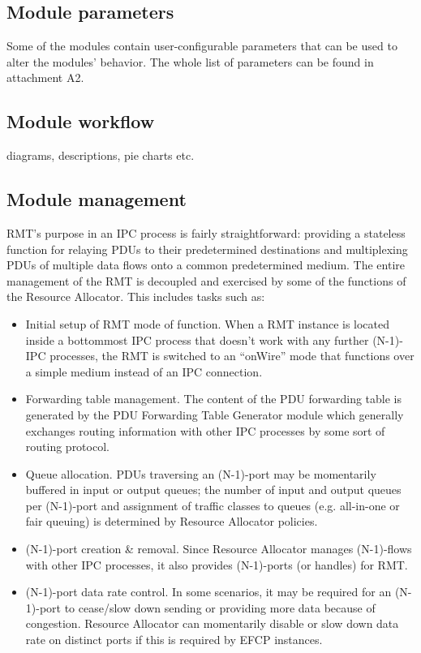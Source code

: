         \subsection{Module parameters}
            Some of the modules contain user-configurable parameters that can be used to alter the modules' behavior. The whole list of parameters can be found in attachment A2.

        \subsection{Module workflow}
            diagrams, descriptions, pie charts etc.

        \subsection{Module management}
            RMT's purpose in an IPC process is fairly straightforward: providing a stateless function for relaying PDUs to their predetermined destinations and multiplexing PDUs of multiple data flows onto a common predetermined medium. The entire management of the RMT is decoupled and exercised by some of the functions of the Resource Allocator. This includes tasks such as:

            \begin{itemize}
                \item Initial setup of RMT mode of function. When a RMT instance is located inside a bottommost IPC process that doesn't work with any further (N-1)-IPC processes, the RMT is switched to an ``onWire'' mode that functions over a simple medium instead of an IPC connection.
                \item Forwarding table management. The content of the PDU forwarding table is generated by the PDU Forwarding Table Generator module which generally exchanges routing information with other IPC processes by some sort of routing protocol.
                \item Queue allocation. PDUs traversing an (N-1)-port may be momentarily buffered in input or output queues; the number of input and output queues per (N-1)-port and assignment of traffic classes to queues (e.g. all-in-one or fair queuing) is determined by Resource Allocator policies.
                \item (N-1)-port creation \& removal. Since Resource Allocator manages (N-1)-flows with other IPC processes, it also provides (N-1)-ports (or handles) for RMT.
                \item (N-1)-port data rate control. In some scenarios, it may be required for an (N-1)-port to cease/slow down sending or providing more data because of congestion. Resource Allocator can momentarily disable or slow down data rate on distinct ports if this is required by EFCP instances.
            \end{itemize}


